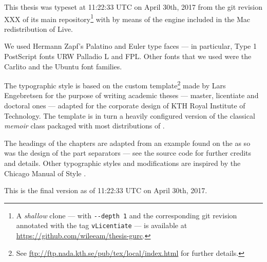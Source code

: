 
This thesis was typeset at 11:22:33 UTC on April 30th, 2017 from the git revision 
XXX of its main repository\footnote{A \emph{shallow} clone --- with \texttt{-{}-depth 
1} and the corresponding git revision annotated with the tag \texttt{vLicentiate} 
--- is available at \url{https://github.com/wileeam/thesis-gurc}.}
with  by means of the  engine  included 
in the Mac redistribution of  Live.

We used Hermann Zapf’s Palatino and Euler type faces --- in particular, Type 1 PostScript 
fonts URW Palladio L and FPL. Other fonts that we used were the Carlito and the 
Ubuntu font families.

The typographic style is based on the custom template\footnote{See \url{ftp://ftp.nada.kth.se/pub/tex/local/index.html} 
for further details.} made by Lars Engebretsen for the purpose of writing academic 
theses --- master, licentiate and doctoral ones --- adapted for the corporate design 
of KTH Royal Institute of Technology. The template is in turn a heavily configured 
version of the classical \emph{memoir} class packaged with most distributions of 
. 

The headings of the chapters are adapted from an example found on the \Internet 
as so was the design of the part separators --- see the source code for further 
credits and details. Other typographic styles and modifications are inspired by 
the Chicago Manual of Style \cite{Chicago10}.

%
%

This is the final version as of 11:22:33 UTC on April 30th, 2017.